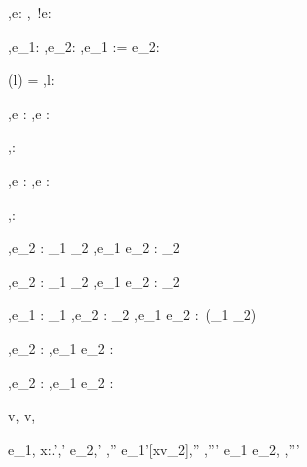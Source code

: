   {\Gamma,\Sigma \infers e:\Reference \beta}
  {\Gamma,\Sigma\infers\ !e:\beta}

  {\Gamma,\Sigma\infers e_1:\Reference \beta \Quad
   \Gamma,\Sigma\infers e_2:\beta}
  {\Gamma,\Sigma\infers e_1 := e_2:\Unit}

  {\Sigma(l) = \beta}
  {\Gamma,\Sigma\infers l:\Reference \beta}


  {\Gamma,\Sigma \infers e : \tau}
  {\Gamma,\Sigma \infers \Edit e : \Task \tau}

  {}
  {\Gamma,\Sigma \infers \Enter \tau : \Task \tau}

  {\Gamma,\Sigma \infers e : \Reference \beta}
  {\Gamma,\Sigma \infers \Update e : \Task \beta}


  {}
  {\Gamma,\Sigma \infers \Fail : \Task \tau}


  {
   {\Gamma,\Sigma \infers e_2 : \tau_1 \to \Task \tau_2}}
  {\Gamma,\Sigma \infers e_1 \Then e_2 : \Task \tau_2}


  {
   {\Gamma,\Sigma \infers e_2 : \tau_1 \to \Task \tau_2}}
  {\Gamma,\Sigma \infers e_1 \Next e_2 : \Task \tau_2}


  {\Gamma,\Sigma \infers e_1 : \Task \tau_1 \Quad
   \Gamma,\Sigma \infers e_2 : \Task \tau_2}
  {\Gamma,\Sigma \infers e_1 \And e_2 : \Task\,(\tau_1 \times \tau_2)}


  {
   {\Gamma,\Sigma \infers e_2 : \Task \tau}}
  {\Gamma,\Sigma \infers e_1 \Or e_2 : \Task \tau}


  {
   {\Gamma,\Sigma \infers e_2 : \Task \tau}}
  {\Gamma,\Sigma \infers e_1 \Xor e_2 : \Task \tau}


  {}
  {v,\hat{\sigma}\hat{\eval} v,\hat{\sigma}}


  {e_1,\hat{\sigma}\hat{\eval} \lambda x:\tau.',\hat{\sigma}'\Quad
   e_2,\hat{\sigma}'\hat{\eval} ,\hat{\sigma}''\Quad
   e_1'[x\mapsto v_2],\hat{\sigma}''\hat{\eval} ,\hat{\sigma}'''}
  {e_1 e_2,\hat{\sigma} \hat{\eval} ,\hat{\sigma}'''}


